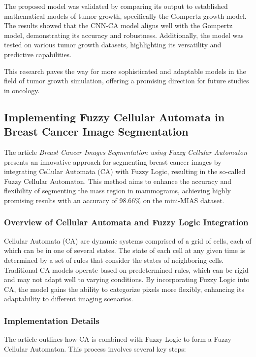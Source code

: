 \documentclass[9pt,a4paper,twoside]{tau-class/tau}
\begin{document}
The proposed model was validated by comparing its output to established mathematical models of tumor growth, specifically the Gompertz growth model. The results showed that the CNN-CA model aligns well with the Gompertz model, demonstrating its accuracy and robustness. Additionally, the model was tested on various tumor growth datasets, highlighting its versatility and predictive capabilities.

This research paves the way for more sophisticated and adaptable models in the field of tumor growth simulation, offering a promising direction for future studies in oncology.

\subsection{Implementing Fuzzy Cellular Automata in Breast Cancer Image Segmentation}

The article \textit{Breast Cancer Images Segmentation using Fuzzy Cellular Automaton} presents an innovative approach for segmenting breast cancer images by integrating Cellular Automata (CA) with Fuzzy Logic, resulting in the so-called Fuzzy Cellular Automaton. This method aims to enhance the accuracy and flexibility of segmenting the mass region in mammograms, achieving highly promising results with an accuracy of 98.66\% on the mini-MIAS dataset.\cite{ION2023999}

\subsubsection{Overview of Cellular Automata and Fuzzy Logic Integration}

Cellular Automata (CA) are dynamic systems comprised of a grid of cells, each of which can be in one of several states. The state of each cell at any given time is determined by a set of rules that consider the states of neighboring cells. Traditional CA models operate based on predetermined rules, which can be rigid and may not adapt well to varying conditions. By incorporating Fuzzy Logic into CA, the model gains the ability to categorize pixels more flexibly, enhancing its adaptability to different imaging scenarios.

\subsubsection{Implementation Details}

The article outlines how CA is combined with Fuzzy Logic to form a Fuzzy Cellular Automaton. This process involves several key steps:
\end{document}
